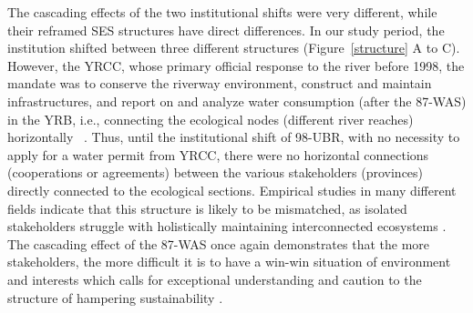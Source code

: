 The cascading effects of the two institutional shifts were very different, while their reframed SES structures have direct differences.
In our study period, the institution shifted between three different structures (Figure~\ref{structure} A to C).
However, the YRCC, whose primary official response to the river before 1998, the mandate was to conserve the riverway environment, construct and maintain infrastructures, and report on and analyze water consumption (after the 87-WAS) in the YRB, i.e., connecting the ecological nodes (different river reaches) horizontally ~\cite{wang2019a}.
Thus, until the institutional shift of 98-UBR, with no necessity to apply for a water permit from YRCC, there were no horizontal connections (cooperations or agreements) between the various stakeholders (provinces) directly connected to the ecological sections.
Empirical studies in many different fields indicate that this structure is likely to be mismatched, as isolated stakeholders struggle with holistically maintaining interconnected ecosystems
\cite{sayles2017,sayles2019,cai2016,bergsten2019}.
The cascading effect of the 87-WAS once again demonstrates that the more stakeholders, the more difficult it is to have a win-win situation of environment and interests \cite{hegwood2022} which calls for exceptional understanding and caution to the structure of hampering sustainability \cite{bergsten2019, sayles2019}.
